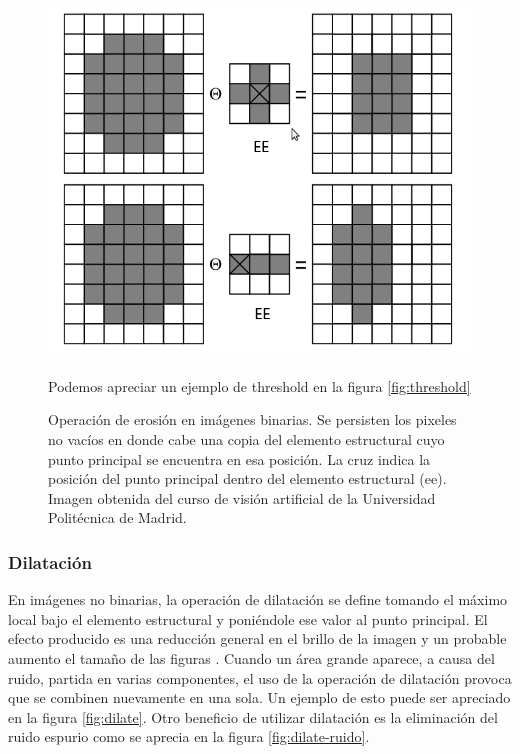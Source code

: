 \begin{figure}[tpb]
\begin{center}
  \includegraphics[scale=0.4]{figuras/erode-sample.png}
\end{center}Podemos apreciar un ejemplo de threshold en la figura \ref{fig:threshold}
  \caption{\small Operación de erosión en imágenes binarias. Se persisten los pixeles no vacíos en donde cabe una copia del elemento estructural cuyo punto principal se encuentra en esa posición. La cruz indica la posición del punto principal dentro del elemento estructural (ee). Imagen obtenida del curso de visión artificial de la Universidad Politécnica de Madrid. } 
  \label{fig:erode-sample}
\end{figure}

	\subsubsection*{Dilatación}
En imágenes no binarias, la operación de dilatación se define tomando el máximo local bajo el elemento estructural y poniéndole ese valor al punto principal. El efecto producido es una reducción general en el brillo de la imagen y un probable aumento el tamaño de las figuras \cite{nasa-dilate-erode}.  Cuando un área grande aparece, a causa del ruido, partida en varias componentes, el uso de la operación de dilatación provoca que  se combinen nuevamente en una sola. Un ejemplo de esto puede ser apreciado en la figura \ref{fig:dilate}. Otro beneficio de utilizar dilatación es la eliminación del ruido espurio como se aprecia en la figura \ref{fig:dilate-ruido}.

